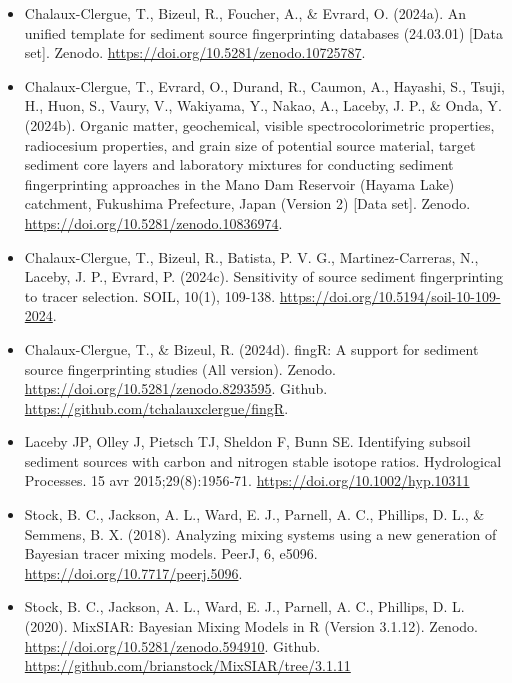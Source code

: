 \documentclass[
]{article}
\begin{document}
\begin{itemize}
\item
  Chalaux-Clergue, T., Bizeul, R., Foucher, A., \& Evrard, O. (2024a).
  An unified template for sediment source fingerprinting databases
  (24.03.01) {[}Data set{]}. Zenodo.
  \url{https://doi.org/10.5281/zenodo.10725787}.
\item
  Chalaux-Clergue, T., Evrard, O., Durand, R., Caumon, A., Hayashi, S.,
  Tsuji, H., Huon, S., Vaury, V., Wakiyama, Y., Nakao, A., Laceby, J.
  P., \& Onda, Y. (2024b). Organic matter, geochemical, visible
  spectrocolorimetric properties, radiocesium properties, and grain size
  of potential source material, target sediment core layers and
  laboratory mixtures for conducting sediment fingerprinting approaches
  in the Mano Dam Reservoir (Hayama Lake) catchment, Fukushima
  Prefecture, Japan (Version 2) {[}Data set{]}. Zenodo.
  \url{https://doi.org/10.5281/zenodo.10836974}.
\item
  Chalaux-Clergue, T., Bizeul, R., Batista, P. V. G., Martinez-Carreras,
  N., Laceby, J. P., Evrard, P. (2024c). Sensitivity of source sediment
  fingerprinting to tracer selection. SOIL, 10(1), 109-138.
  \url{https://doi.org/10.5194/soil-10-109-2024}.
\item
  Chalaux-Clergue, T., \& Bizeul, R. (2024d). fingR: A support for
  sediment source fingerprinting studies (All version). Zenodo.
  \url{https://doi.org/10.5281/zenodo.8293595}. Github.
  \url{https://github.com/tchalauxclergue/fingR}.
\item
  Laceby JP, Olley J, Pietsch TJ, Sheldon F, Bunn SE. Identifying
  subsoil sediment sources with carbon and nitrogen stable isotope
  ratios. Hydrological Processes. 15 avr 2015;29(8):1956‑71.
  \url{https://doi.org/10.1002/hyp.10311}
\item
  Stock, B. C., Jackson, A. L., Ward, E. J., Parnell, A. C., Phillips,
  D. L., \& Semmens, B. X. (2018). Analyzing mixing systems using a new
  generation of Bayesian tracer mixing models. PeerJ, 6, e5096.
  \url{https://doi.org/10.7717/peerj.5096}.
\item
  Stock, B. C., Jackson, A. L., Ward, E. J., Parnell, A. C., Phillips,
  D. L. (2020). MixSIAR: Bayesian Mixing Models in R (Version 3.1.12).
  Zenodo. \url{https://doi.org/10.5281/zenodo.594910}. Github.
  \url{https://github.com/brianstock/MixSIAR/tree/3.1.11}
\end{itemize}
\end{document}
